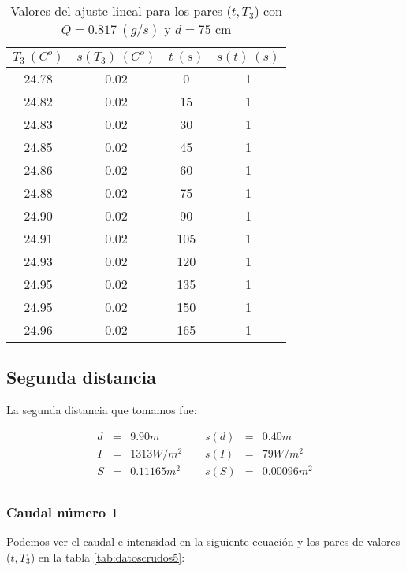 \documentclass[12pt,a4paper]{article}
\begin{document}
 \begin{table}[h!] 	 \centering 
\begin{tabular}{|c|c|c|c|} 
\hline 
$T_3 \ (C^o)$ & $s(T_3) \ (C^o)$ & $ t \ (s)$ & $s(t) \ (s)$  \\ \hline 
24.78  & 0.02 &  0 & 1 \\ 
\hline
24.82  & 0.02 &  15 & 1 \\ 
\hline
24.83  & 0.02 &  30 & 1 \\ 
\hline
24.85  & 0.02 &  45 & 1 \\ 
\hline
24.86  & 0.02 &  60 & 1 \\ 
\hline
24.88  & 0.02 &  75 & 1 \\ 
\hline
24.90  & 0.02 &  90 & 1 \\ 
\hline
24.91  & 0.02 &  105 & 1 \\ 
\hline
24.93  & 0.02 &  120 & 1 \\ 
\hline
24.95  & 0.02 &  135 & 1 \\ 
\hline
24.95  & 0.02 &  150 & 1 \\ 
\hline
24.96  & 0.02 &  165 & 1 \\ 
\hline
\end{tabular} 
\caption{Valores del ajuste lineal para los pares ($t,T_3$) con $Q=0.817 \ (g/s)$ y $d= 75 $ cm} 
\label{tab:datoscrudos4} 
\end{table} 
 
 
 \newpage
 
\subsection{Segunda distancia}
La segunda distancia que tomamos fue: 
 
\begin{equation} 
\begin{array}{lllllll}
d & = & 9.90 m &  \ \ &  s(d) & =  & 0.40  m \\ 
 I & = & 1313 W/m^2 &  \ \ &  s(I) & =  & 79  W/m^2 \\ 
 S & = & 0.11165 m^2 &  \ \ &  s(S) & =  & 0.00096  m^2 \\ 
 \end{array} 
\end{equation} 
 
 \subsubsection{Caudal número 1} \label{subsec:6} 
 
Podemos ver el caudal e intensidad en la siguiente ecuación y los pares de valores ($t,T_3$) en la tabla \ref{tab:datoscrudos5}: 
 
\end{document}

